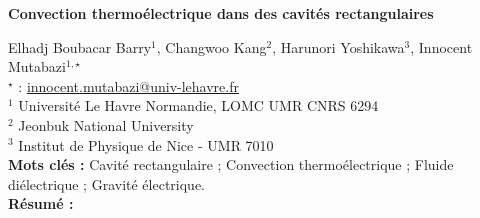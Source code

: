 


    \newpage

\BgThispage

%
\begin{flushleft}
\addtocounter{section}{1}
{\Large \textbf{Convection thermoélectrique dans des cavités rectangulaires}}\label{ref:81}
\end{flushleft}
%
Elhadj Boubacar Barry$^{1}$, Changwoo Kang$^{2}$, Harunori Yoshikawa$^{3}$, Innocent Mutabazi$^{1,\star}$\\[2mm]
$^{\star}$ \Letter : \url{innocent.mutabazi@univ-lehavre.fr}\\[2mm]
{\footnotesize $^{1}$ Université Le Havre Normandie, LOMC UMR CNRS 6294}\\
{\footnotesize $^{2}$ Jeonbuk National University}\\
{\footnotesize $^{3}$ Institut de Physique de Nice - UMR 7010}\\
[4mm]
%
\noindent \textbf{Mots clés : } Cavité rectangulaire ; Convection thermoélectrique ; Fluide diélectrique ; Gravité électrique.\\[4mm]
%
\noindent \textbf{Résumé : } 

